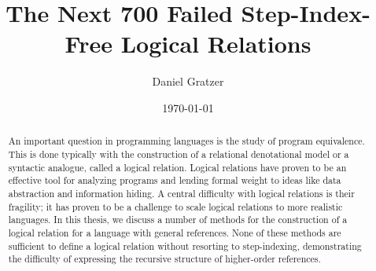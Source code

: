 \documentclass{amsart}
\title{The Next 700 Failed Step-Index-Free Logical Relations}
\author{Daniel Gratzer}
\date{\today}
\begin{document}
\begin{abstract}
  An important question in programming languages is the study of
  program equivalence. This is done typically with the construction of
  a relational denotational model or a syntactic analogue, called a
  logical relation. Logical relations have proven to be an effective
  tool for analyzing programs and lending formal weight to ideas like
  data abstraction and information hiding. A central difficulty with
  logical relations is their fragility; it has proven to be a
  challenge to scale logical relations to more realistic languages. In
  this thesis, we discuss a number of methods for the construction of
  a logical relation for a language with general references. None of
  these methods are sufficient to define a logical relation without
  resorting to step-indexing, demonstrating the difficulty of
  expressing the recursive structure of higher-order references.
\end{abstract}
\maketitle











\end{document}
